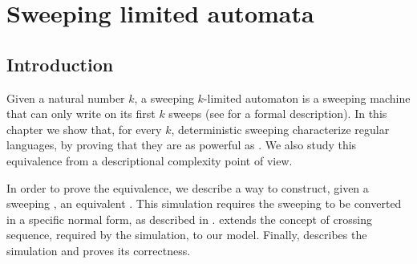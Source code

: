 \chapter{Sweeping limited automata}



\section{Introduction}
Given a natural number $k$, a sweeping $k$-limited automaton is a sweeping machine that can only write on its first $k$ sweeps (see  for a formal description).
In this chapter we show that, for every $k$, deterministic sweeping \kLAs characterize regular languages, by proving that they are as powerful as \NFAs. We also study this equivalence from a descriptional complexity point of view.

In order to prove the equivalence, we describe a way to construct, given a sweeping \kDLA, an equivalent \NFA.
This simulation requires the sweeping \kDLA to be converted in a specific normal form, as described in .
 extends the concept of crossing sequence, required by the simulation, to our model.
Finally,  describes the simulation and proves its correctness.



